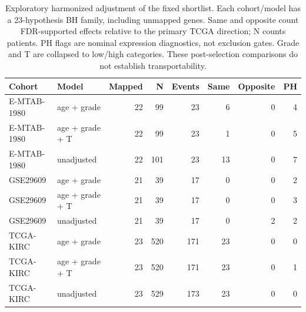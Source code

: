 \begin{table}[htbp]\centering\small\setlength{\tabcolsep}{3pt}
\caption{Exploratory harmonized adjustment of the fixed shortlist. Each cohort/model has a 23-hypothesis BH family, including unmapped genes. Same and opposite count FDR-supported effects relative to the primary TCGA direction; N counts patients. PH flags are nominal expression diagnostics, not exclusion gates. Grade and T are collapsed to low/high categories. These post-selection comparisons do not establish transportability.}
\label{tab:harmonized}\begin{tabular}{llrrrrrr}\toprule
Cohort & Model & Mapped & N & Events & Same & Opposite & PH \\
\midrule
E-MTAB-1980 & age + grade & 22 &  99 &  23 &  6 & 0 & 4 \\
E-MTAB-1980 & age + grade + T & 22 &  99 &  23 &  1 & 0 & 5 \\
E-MTAB-1980 & unadjusted & 22 & 101 &  23 & 13 & 0 & 7 \\
GSE29609 & age + grade & 21 &  39 &  17 &  0 & 0 & 2 \\
GSE29609 & age + grade + T & 21 &  39 &  17 &  0 & 0 & 3 \\
GSE29609 & unadjusted & 21 &  39 &  17 &  0 & 2 & 2 \\
TCGA-KIRC & age + grade & 23 & 520 & 171 & 23 & 0 & 0 \\
TCGA-KIRC & age + grade + T & 23 & 520 & 171 & 23 & 0 & 1 \\
TCGA-KIRC & unadjusted & 23 & 529 & 173 & 23 & 0 & 0 \\
\bottomrule\end{tabular}\end{table}
